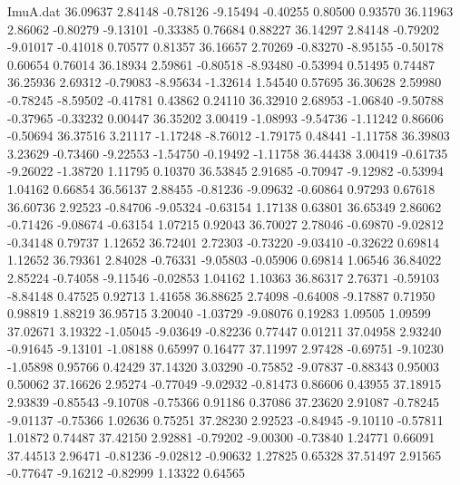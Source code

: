\begin{filecontents}{ImuA.dat}
  36.09637    2.84148   -0.78126   -9.15494   -0.40255    0.80500    0.93570
  36.11963    2.86062   -0.80279   -9.13101   -0.33385    0.76684    0.88227
  36.14297    2.84148   -0.79202   -9.01017   -0.41018    0.70577    0.81357
  36.16657    2.70269   -0.83270   -8.95155   -0.50178    0.60654    0.76014
  36.18934    2.59861   -0.80518   -8.93480   -0.53994    0.51495    0.74487
  36.25936    2.69312   -0.79083   -8.95634   -1.32614    1.54540    0.57695
  36.30628    2.59980   -0.78245   -8.59502   -0.41781    0.43862    0.24110
  36.32910    2.68953   -1.06840   -9.50788   -0.37965   -0.33232    0.00447
  36.35202    3.00419   -1.08993   -9.54736   -1.11242    0.86606   -0.50694
  36.37516    3.21117   -1.17248   -8.76012   -1.79175    0.48441   -1.11758
  36.39803    3.23629   -0.73460   -9.22553   -1.54750   -0.19492   -1.11758
  36.44438    3.00419   -0.61735   -9.26022   -1.38720    1.11795    0.10370
  36.53845    2.91685   -0.70947   -9.12982   -0.53994    1.04162    0.66854
  36.56137    2.88455   -0.81236   -9.09632   -0.60864    0.97293    0.67618
  36.60736    2.92523   -0.84706   -9.05324   -0.63154    1.17138    0.63801
  36.65349    2.86062   -0.71426   -9.08674   -0.63154    1.07215    0.92043
  36.70027    2.78046   -0.69870   -9.02812   -0.34148    0.79737    1.12652
  36.72401    2.72303   -0.73220   -9.03410   -0.32622    0.69814    1.12652
  36.79361    2.84028   -0.76331   -9.05803   -0.05906    0.69814    1.06546
  36.84022    2.85224   -0.74058   -9.11546   -0.02853    1.04162    1.10363
  36.86317    2.76371   -0.59103   -8.84148    0.47525    0.92713    1.41658
  36.88625    2.74098   -0.64008   -9.17887    0.71950    0.98819    1.88219
  36.95715    3.20040   -1.03729   -9.08076    0.19283    1.09505    1.09599
  37.02671    3.19322   -1.05045   -9.03649   -0.82236    0.77447    0.01211
  37.04958    2.93240   -0.91645   -9.13101   -1.08188    0.65997    0.16477
  37.11997    2.97428   -0.69751   -9.10230   -1.05898    0.95766    0.42429
  37.14320    3.03290   -0.75852   -9.07837   -0.88343    0.95003    0.50062
  37.16626    2.95274   -0.77049   -9.02932   -0.81473    0.86606    0.43955
  37.18915    2.93839   -0.85543   -9.10708   -0.75366    0.91186    0.37086
  37.23620    2.91087   -0.78245   -9.01137   -0.75366    1.02636    0.75251
  37.28230    2.92523   -0.84945   -9.10110   -0.57811    1.01872    0.74487
  37.42150    2.92881   -0.79202   -9.00300   -0.73840    1.24771    0.66091
  37.44513    2.96471   -0.81236   -9.02812   -0.90632    1.27825    0.65328
  37.51497    2.91565   -0.77647   -9.16212   -0.82999    1.13322    0.64565

\end{filecontents}
